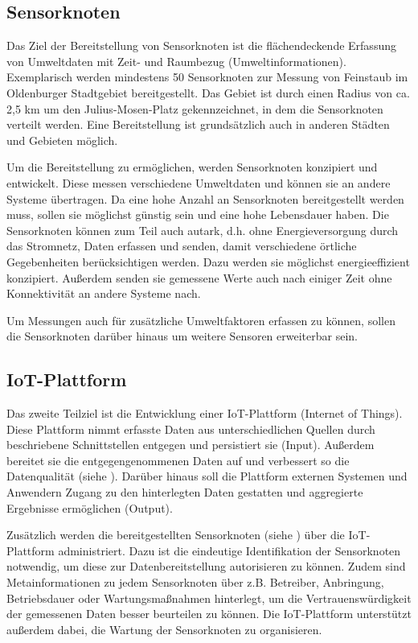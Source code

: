\subsection{Sensorknoten}
\label{sec:Sensorknoten}
Das Ziel der Bereitstellung von Sensorknoten ist die flächendeckende Erfassung von Umweltdaten mit Zeit- und Raumbezug (Umweltinformationen). Exemplarisch werden mindestens 50 Sensorknoten zur Messung von Feinstaub im Oldenburger Stadtgebiet bereitgestellt. Das Gebiet ist durch einen Radius von ca. 2,5 km um den Julius-Mosen-Platz gekennzeichnet, in dem die Sensorknoten verteilt werden. Eine Bereitstellung ist grundsätzlich auch in anderen Städten und Gebieten möglich.

Um die Bereitstellung zu ermöglichen, werden Sensorknoten konzipiert und entwickelt. Diese messen verschiedene Umweltdaten und können sie an andere Systeme übertragen. Da eine hohe Anzahl an Sensorknoten bereitgestellt werden muss, sollen sie möglichst günstig sein und eine hohe Lebensdauer haben. Die Sensorknoten können zum Teil auch autark, d.h. ohne Energieversorgung durch das Stromnetz, Daten erfassen und senden, damit verschiedene örtliche Gegebenheiten berücksichtigen werden. Dazu werden sie möglichst energieeffizient konzipiert. Außerdem senden sie gemessene Werte auch nach einiger Zeit ohne Konnektivität an andere Systeme nach.

Um Messungen auch für zusätzliche Umweltfaktoren erfassen zu können, sollen die Sensorknoten darüber hinaus um weitere Sensoren erweiterbar sein.

\subsection{IoT-Plattform}
\label{sec:IoT-Plattform}
Das zweite Teilziel ist die Entwicklung einer IoT-Plattform (Internet of Things). Diese Plattform nimmt erfasste Daten aus unterschiedlichen Quellen durch beschriebene Schnittstellen entgegen und persistiert sie (Input). Außerdem bereitet sie die entgegengenommenen Daten auf und verbessert so die Datenqualität (siehe ). Darüber hinaus soll die Plattform externen Systemen und Anwendern Zugang zu den hinterlegten Daten gestatten und aggregierte Ergebnisse ermöglichen (Output).

Zusätzlich werden die bereitgestellten Sensorknoten (siehe ) über die IoT-Plattform administriert. Dazu ist die eindeutige Identifikation der Sensorknoten notwendig, um diese zur Datenbereitstellung autorisieren zu können. Zudem sind Metainformationen zu jedem Sensorknoten über z.B. Betreiber, Anbringung, Betriebsdauer oder Wartungsmaßnahmen hinterlegt, um die Vertrauenswürdigkeit der gemessenen Daten besser beurteilen zu können. Die IoT-Plattform unterstützt außerdem dabei, die Wartung der Sensorknoten zu organisieren.

